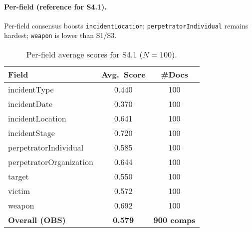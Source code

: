 \paragraph{Per-field (reference for S4.1).}
Per-field consensus boosts \texttt{incidentLocation}; \texttt{perpetratorIndividual} remains hardest; \texttt{weapon} is lower than S1/S3.

\begin{table}[H]
    \centering
    \caption{Per-field average scores for S4.1 ($N{=}100$).}
    \label{tab:s4-perfield}
    \begin{tabular}{lcc}
        \toprule
        Field & Avg.\ Score & \#Docs \\
        \midrule
        incidentType & 0.440 & 100 \\
        incidentDate & 0.370 & 100 \\
        incidentLocation & 0.641 & 100 \\
        incidentStage & 0.720 & 100 \\
        perpetratorIndividual & 0.585 & 100 \\
        perpetratorOrganization & 0.644 & 100 \\
        target & 0.550 & 100 \\
        victim & 0.572 & 100 \\
        weapon & 0.692 & 100 \\
        \midrule
        \textbf{Overall (OBS)} & \textbf{0.579} & \textbf{900 comps} \\
        \bottomrule
    \end{tabular}
\end{table}

